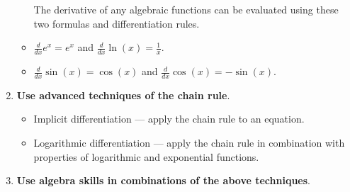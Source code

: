 \documentclass[../main.tex]{subfiles}
\begin{document}
\begin{enumerate}
\begin{itemize}
        The derivative of any algebraic functions can be evaluated using these two formulas and differentiation rules.

      \item \(\frac{d}{dx} e^{x} = e^{x}\) and \(\frac{d}{dx} \ln(x) = \frac{1}{x}\).
        
      \item \(\frac{d}{dx} \sin(x) = \cos(x)\) and \(\frac{d}{dx} \cos(x) = - \sin(x)\).
    \end{itemize}

  \item \textbf{Use advanced techniques of the chain rule}.
    \begin{itemize}
      \item Implicit differentiation --- apply the chain rule to an equation. 
      \item Logarithmic differentiation --- apply the chain rule in combination with properties of logarithmic and exponential functions.
    \end{itemize}

  \item \textbf{Use algebra skills in combinations of the above techniques}.
\end{enumerate}
\end{document}
